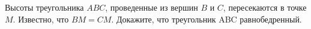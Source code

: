 Высоты треугольника $ABC$, проведенные из вершин $B$ и $C$, пересекаются в точке $M$. Известно, что $BM = CM$. Докажите, что треугольник ABC равнобедренный.